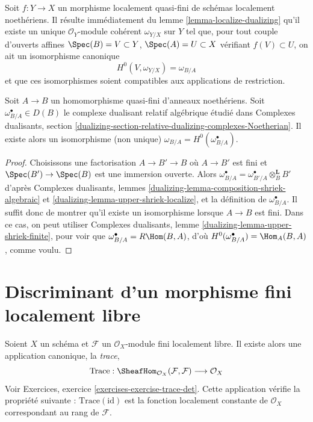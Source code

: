 \begin{remark}
\label{remark-relative-dualizing-for-quasi-finite}
Soit $f : Y \to X$ un morphisme localement quasi-fini de schémas localement
noethériens. Il résulte immédiatement du lemme \ref{lemma-localize-dualizing}
qu'il existe un unique $\mathcal{O}_Y$-module cohérent
$\omega_{Y/X}$ sur $Y$ tel que, pour tout couple d'ouverts affines
$\Spec(B) = V \subset Y$, $\Spec(A) = U \subset X$ vérifiant $f(V) \subset U$,
on ait un isomorphisme canonique
$$
H^0(V, \omega_{Y/X}) = \omega_{B/A}
$$
et que ces isomorphismes soient compatibles aux applications de restriction.
\end{remark}

\begin{lemma}
\label{lemma-compare-dualizing-algebraic}
Soit $A \to B$ un homomorphisme quasi-fini d'anneaux noethériens.
Soit $\omega_{B/A}^\bullet \in D(B)$ le complexe dualisant relatif
algébrique étudié dans Complexes dualisants, section
\ref{dualizing-section-relative-dualizing-complexes-Noetherian}.
Il existe alors un isomorphisme (non unique)
$\omega_{B/A} = H^0(\omega_{B/A}^\bullet)$.
\end{lemma}

\begin{proof}
Choisissons une factorisation $A \to B' \to B$
où $A \to B'$ est fini et $\Spec(B') \to \Spec(B)$
est une immersion ouverte. Alors
$\omega_{B/A}^\bullet = \omega_{B'/A}^\bullet \otimes_B^\mathbf{L} B'$
d'après Complexes dualisants, lemmes
\ref{dualizing-lemma-composition-shriek-algebraic} et
\ref{dualizing-lemma-upper-shriek-localize}, et
la définition de $\omega_{B/A}^\bullet$. Il suffit donc
de montrer qu'il existe un isomorphisme lorsque $A \to B$ est fini.
Dans ce cas, on peut utiliser
Complexes dualisants, lemme \ref{dualizing-lemma-upper-shriek-finite},
pour voir que $\omega_{B/A}^\bullet = R\Hom(B, A)$, d'où
$H^0(\omega^\bullet_{B/A}) = \Hom_A(B, A)$, comme voulu.
\end{proof}





\section{Discriminant d'un morphisme fini localement libre}
\label{section-discriminant}

\noindent
Soient $X$ un schéma et $\mathcal{F}$ un $\mathcal{O}_X$-module fini localement
libre. Il existe alors une application canonique, la {\it trace},
$$
\text{Trace} :
\SheafHom_{\mathcal{O}_X}(\mathcal{F}, \mathcal{F})
\longrightarrow
\mathcal{O}_X
$$
Voir Exercices, exercice \ref{exercises-exercise-trace-det}. Cette application vérifie
la propriété suivante : $\text{Trace}(\text{id})$ est la fonction localement constante
de $\mathcal{O}_X$ correspondant au rang de $\mathcal{F}$.

